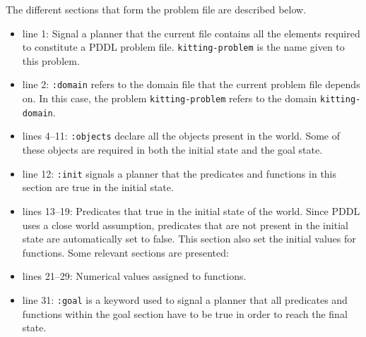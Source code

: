 The different sections that form the problem file are described below.
\begin{itemize}
\item line 1: Signal a planner that the current file contains all the elements required to constitute a PDDL problem file. \texttt{kitting-problem} is the name given to this problem.
\item line 2: \texttt{:domain} refers to the domain file that the current problem file depends on. In this case, the problem \texttt{kitting-problem} refers to the domain \texttt{kitting-domain}.
\item lines 4--11: \texttt{:objects} declare all the objects present in the world. Some of these objects are required in both the initial state and the goal state.
\item line 12: \texttt{:init} signals a planner that the predicates and functions in this section are true in the initial state.
\item lines 13--19: Predicates that true in the initial state of the world. Since PDDL uses a close world assumption, predicates that are not present in the initial state are automatically set to false. This section also set the initial values for functions. Some relevant sections are presented:
\item lines 21--29: Numerical values assigned to functions.
\item line 31: \texttt{:goal} is a keyword used to signal a planner that all predicates and functions within the goal section have to be true in order to reach the final state.
\end{itemize}

